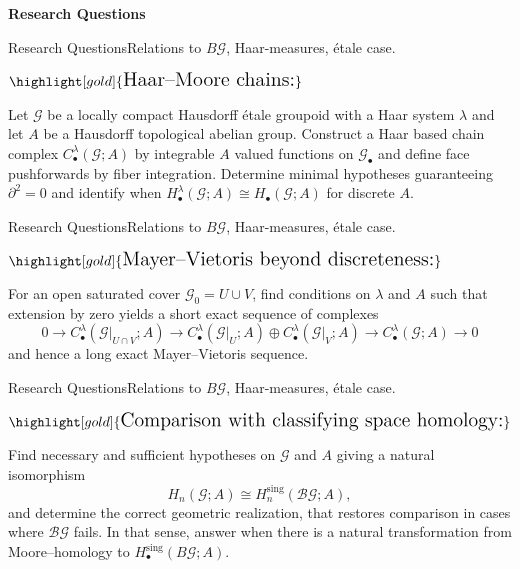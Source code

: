 \documentclass[aspectratio=169]{beamer}
\newcommand{\G}{\mathcal{G}}
\begin{document}
\begin{frame}[plain,c]
  \begin{center}
    \Huge \textbf{Research Questions}
  \end{center}
\end{frame}

\begin{frame}{Research Questions}{Relations to $B\G$, Haar-measures, étale case.}
\begin{center}
\(\highlight[gold]{\text{\Large Haar--Moore chains:}}\)
\vspace{0.2cm}

Let $\G$ be a locally compact Hausdorff étale groupoid with a Haar system $\lambda$ and let $A$ be a Hausdorff topological abelian group.
Construct a Haar based chain complex $C_\bullet^\lambda({\G};A)$ by integrable $A$ valued functions on ${\G}_\bullet$ and define face pushforwards by fiber integration.
Determine minimal hypotheses guaranteeing $\partial^2=0$ and identify when $H_\bullet^\lambda({\G};A)\cong H_\bullet({\G};A)$ for discrete $A$.
\end{center}
\end{frame}

\begin{frame}{Research Questions}{Relations to $B\G$, Haar-measures, étale case.}
\begin{center}
\(\highlight[gold]{\text{\Large Mayer--Vietoris beyond discreteness:}}\)
\vspace{0.2cm}

For an open saturated cover ${\G}_0=U\cup V$, find conditions on $\lambda$ and $A$ such that extension by zero yields a short exact sequence of complexes
\[
0\to C_\bullet^\lambda({\G}\vert_{U\cap V};A)\to C_\bullet^\lambda({\G}\vert_U;A)\oplus C_\bullet^\lambda({\G}\vert_V;A)\to C_\bullet^\lambda({\G};A)\to 0
\]
and hence a long exact Mayer--Vietoris sequence.
\end{center}
\end{frame}

\begin{frame}{Research Questions}{Relations to $B\G$, Haar-measures, étale case.}
\begin{center}
\(\highlight[gold]{\text{\Large Comparison with classifying space homology:}}\)
\vspace{0.2cm}

Find necessary and sufficient hypotheses on ${\G}$ and $A$ giving a natural isomorphism
\[
H_n({\G};A)\cong H_n^{\mathrm{sing}}(\mathcal B{\G};A),
\]
and determine the correct geometric realization, that restores comparison in cases where $\mathcal B{\G}$ fails. In that sense, answer when there is a natural transformation from Moore--homology to $H_\bullet^{\text{sing}}(B\G;A)$.
\end{center}
\end{frame}
\end{document}
